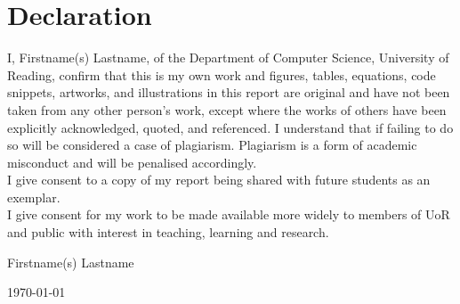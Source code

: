 \documentclass{article}
\begin{document}
    
    \newpage
    \thispagestyle{empty}
    \chapter*{\Large Declaration}
    I,
     Firstname(s) Lastname, %
    of the Department of Computer Science, University of Reading, confirm that this is my own work and figures, tables, equations, code snippets, artworks, and illustrations in this report are original and have not been taken from any other person's work, except where the works of others have been explicitly acknowledged, quoted, and referenced. I understand that if failing to do so will be considered a case of plagiarism. Plagiarism is a form of academic misconduct and will be penalised accordingly. \\
    
    \noindent
    I give consent to a copy of my report being shared with future students as an exemplar. \\
    
    \noindent
    I give consent for my work to be made available more widely to members of UoR and public with interest in teaching, learning and research. 
    ~\\[1cm]
    \begin{flushright}
	Firstname(s) Lastname %
    
    \today
    \end{flushright}

     
    
\end{document}

